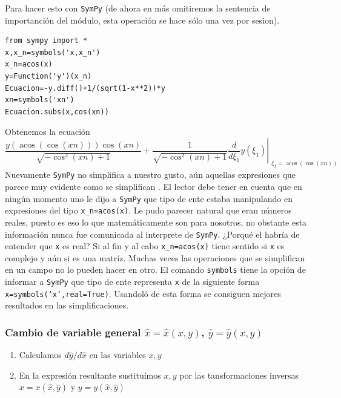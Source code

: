 Para hacer esto con \texttt{SymPy} (de ahora en más omitiremos la sentencia de importanción del módulo, esta operación se hace sólo una vez por sesion).


\begin{lstlisting}
from sympy import *
x,x_n=symbols('x,x_n')
x_n=acos(x)
y=Function('y')(x_n)
Ecuacion=-y.diff()+1/(sqrt(1-x**2))*y
xn=symbols('xn')
Ecuacion.subs(x,cos(xn))
\end{lstlisting}
Obtenemos la ecuación
\[\frac{y{\left (\operatorname{acos}{\left (\cos{\left (xn \right )} \right )} \right )} \cos{\left (xn \right )}}{\sqrt{- \cos^{2}{\left (xn \right )} + 1}}
+ \frac{1}{\sqrt{- \cos^{2}{\left (xn \right )} + 1}} \left. \frac{d}{d \xi_{1
}} y{\left (\xi_{1} \right )} \right|_{\substack{ \xi_{1}=\operatorname{acos}{
\left (\cos{\left (xn \right )} \right )} }}\]
Nuevamente \texttt{SymPy} no simplifica a nuestro gusto, aún aquellas expresiones que parece muy evidente como se simplifican . El lector debe tener en cuenta que en ningún momento uno le dijo a \texttt{SymPy} que tipo de ente estaba manipulando en expresiones del tipo \texttt{x\_n=acos(x)}. Le pudo parecer natural que eran números reales, puesto es eso lo que matemáticamente son para nosotros, no obstante esta información nunca fue comunicada al interprete de \texttt{SymPy}. ¿Porqué el habría de entender que \texttt{x} es real? Si al fin y al cabo \texttt{x\_n=acos(x)} tiene sentido si \texttt{x} es complejo y aún si es una matríz. Muchas veces las operaciones que se simplifican en un campo no lo pueden hacer en otro. El comando  \texttt{symbols} tiene la opción de informar a \texttt{SymPy} que tipo de ente representa \texttt{x} de la siguiente forma
\texttt{x=symbols('x',real=True)}. Usandoló de esta forma se consiguen mejores resultados en las simplificaciones.


\subsubsection{Cambio de variable general $\hat{x}=\hat{x}(x,y)$, $\hat{y}=\hat{y}(x,y)$}
\begin{enumerate}
  \item Calculamos $d\hat{y}/d\hat{x}$ en las variables $x,y$

   \item En la expresión resultante sustituímos $x,y$ por las tansformaciones 			inversas $x=x(\hat{x},\hat{y})$ y  $y=y(\hat{x},\hat{y})$
\end{enumerate}



